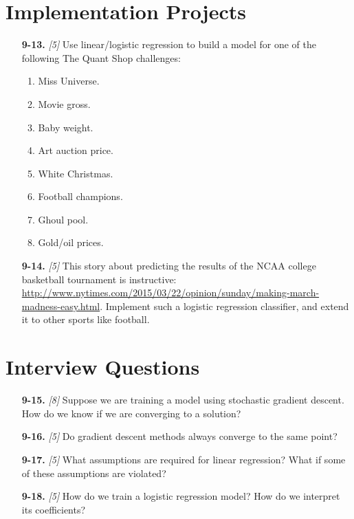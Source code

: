 \documentclass[10pt]{article}
\begin{document}
\section*{Implementation Projects}
\begin{enumerate}
    \item [{\bf 9-13.}] \emph{[5]} Use linear/logistic regression to build a model for one of the following The Quant Shop challenges:
    \begin{enumerate}
        \item Miss Universe.
        \item Movie gross.
        \item Baby weight.
        \item Art auction price.
        \item White Christmas.
        \item Football champions.
        \item Ghoul pool.
        \item Gold/oil prices.
    \end{enumerate}
    \item [{\bf 9-14.}] \emph{[5]} This story about predicting the results of the NCAA college basketball tournament is instructive: \href{http://www.nytimes.com/2015/03/22/opinion/sunday/making-march-madness-easy}{http://www.nytimes.com/2015/03/22/opinion/sunday/making-march-madness-easy.html}. Implement such a logistic regression classifier, and extend it to other sports like football.
\end{enumerate}

\section*{Interview Questions}
\begin{enumerate}
    \item [{\bf 9-15.}] \emph{[8]} Suppose we are training a model using stochastic gradient descent. How do we know if we are converging to a solution?
    \item [{\bf 9-16.}] \emph{[5]} Do gradient descent methods always converge to the same point?
    \item [{\bf 9-17.}] \emph{[5]} What assumptions are required for linear regression? What if some of these assumptions are violated?
    \item [{\bf 9-18.}] \emph{[5]} How do we train a logistic regression model? How do we interpret its coefficients?
\end{enumerate}
\end{document}
